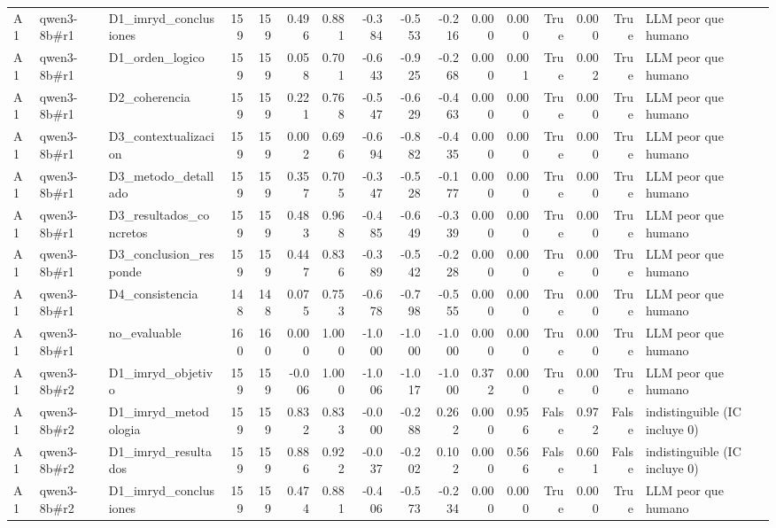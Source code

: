 \begin{table}
{\begin{tabular}{lllrrrrrrrrrrrrl}
A1 & qwen3-8b\#r1 & D1\_imryd\_conclusiones & 159 & 159 & 0.496 & 0.881 & -0.384 & -0.553 & -0.216 & 0.000 & 0.000 & True & 0.000 & True & LLM peor que humano \\
A1 & qwen3-8b\#r1 & D1\_orden\_logico & 159 & 159 & 0.058 & 0.701 & -0.643 & -0.925 & -0.268 & 0.000 & 0.001 & True & 0.002 & True & LLM peor que humano \\
A1 & qwen3-8b\#r1 & D2\_coherencia & 159 & 159 & 0.221 & 0.768 & -0.547 & -0.629 & -0.463 & 0.000 & 0.000 & True & 0.000 & True & LLM peor que humano \\
A1 & qwen3-8b\#r1 & D3\_contextualizacion & 159 & 159 & 0.002 & 0.696 & -0.694 & -0.882 & -0.435 & 0.000 & 0.000 & True & 0.000 & True & LLM peor que humano \\
A1 & qwen3-8b\#r1 & D3\_metodo\_detallado & 159 & 159 & 0.357 & 0.705 & -0.347 & -0.528 & -0.177 & 0.000 & 0.000 & True & 0.000 & True & LLM peor que humano \\
A1 & qwen3-8b\#r1 & D3\_resultados\_concretos & 159 & 159 & 0.483 & 0.968 & -0.485 & -0.649 & -0.339 & 0.000 & 0.000 & True & 0.000 & True & LLM peor que humano \\
A1 & qwen3-8b\#r1 & D3\_conclusion\_responde & 159 & 159 & 0.447 & 0.836 & -0.389 & -0.542 & -0.228 & 0.000 & 0.000 & True & 0.000 & True & LLM peor que humano \\
A1 & qwen3-8b\#r1 & D4\_consistencia & 148 & 148 & 0.075 & 0.753 & -0.678 & -0.798 & -0.555 & 0.000 & 0.000 & True & 0.000 & True & LLM peor que humano \\
A1 & qwen3-8b\#r1 & no\_evaluable & 160 & 160 & 0.000 & 1.000 & -1.000 & -1.000 & -1.000 & 0.000 & 0.000 & True & 0.000 & True & LLM peor que humano \\
A1 & qwen3-8b\#r2 & D1\_imryd\_objetivo & 159 & 159 & -0.006 & 1.000 & -1.006 & -1.017 & -1.000 & 0.372 & 0.000 & True & 0.000 & True & LLM peor que humano \\
A1 & qwen3-8b\#r2 & D1\_imryd\_metodologia & 159 & 159 & 0.832 & 0.833 & -0.000 & -0.288 & 0.262 & 0.000 & 0.956 & False & 0.972 & False & indistinguible (IC incluye 0) \\
A1 & qwen3-8b\#r2 & D1\_imryd\_resultados & 159 & 159 & 0.886 & 0.922 & -0.037 & -0.202 & 0.102 & 0.000 & 0.566 & False & 0.601 & False & indistinguible (IC incluye 0) \\
A1 & qwen3-8b\#r2 & D1\_imryd\_conclusiones & 159 & 159 & 0.474 & 0.881 & -0.406 & -0.573 & -0.234 & 0.000 & 0.000 & True & 0.000 & True & LLM peor que humano \\

\end{tabular}}
\end{table}
